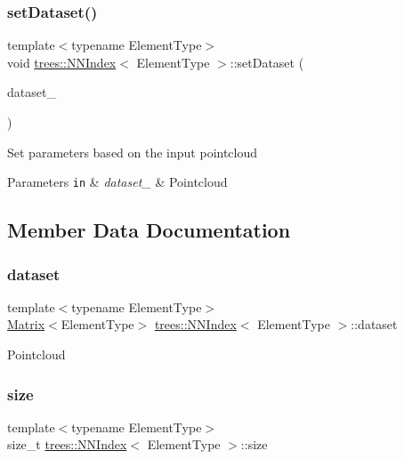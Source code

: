 \subsubsection{\texorpdfstring{set\+Dataset()}{setDataset()}}
{\footnotesize\ttfamily template$<$typename Element\+Type$>$ \\
void \hyperlink{classtrees_1_1_n_n_index}{trees\+::\+N\+N\+Index}$<$ Element\+Type $>$\+::set\+Dataset (\begin{DoxyParamCaption}\item[{const \hyperlink{classtrees_1_1_matrix}{Matrix}$<$ Element\+Type $>$ \&}]{dataset\+\_\+ }\end{DoxyParamCaption})\hspace{0.3cm}{\ttfamily [inline]}}

Set parameters based on the input pointcloud


\begin{DoxyParams}[1]{Parameters}
\mbox{\tt in}  & {\em dataset\+\_\+} & Pointcloud \\
\hline
\end{DoxyParams}


\subsection{Member Data Documentation}
\mbox{\label{classtrees_1_1_n_n_index_a895867d67826166ea69def3488847cc6}} 
\subsubsection{\texorpdfstring{dataset}{dataset}}
{\footnotesize\ttfamily template$<$typename Element\+Type$>$ \\
\hyperlink{classtrees_1_1_matrix}{Matrix}$<$Element\+Type$>$ \hyperlink{classtrees_1_1_n_n_index}{trees\+::\+N\+N\+Index}$<$ Element\+Type $>$\+::dataset\hspace{0.3cm}{\ttfamily [protected]}}

Pointcloud \mbox{\label{classtrees_1_1_n_n_index_a2c14aa447b5461fb839213f092881b23}} 
\subsubsection{\texorpdfstring{size}{size}}
{\footnotesize\ttfamily template$<$typename Element\+Type$>$ \\
size\+\_\+t \hyperlink{classtrees_1_1_n_n_index}{trees\+::\+N\+N\+Index}$<$ Element\+Type $>$\+::size\hspace{0.3cm}{\ttfamily [protected]}}

